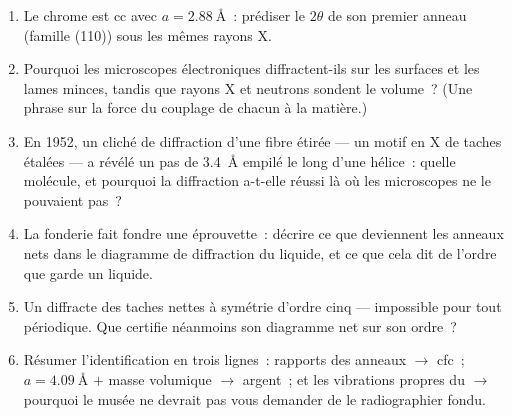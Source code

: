 \begin{problem}
\begin{enumerate}[resume]
  \item Le chrome est cc avec $a = \qty{2.88}{\angstrom}$~: prédiser
        le $2\theta$ de son premier anneau (famille (110)) sous les
        mêmes rayons X.
  \item Pourquoi les microscopes électroniques diffractent-ils sur
        les surfaces et les lames minces, tandis que rayons X et
        neutrons sondent le volume~? (Une phrase sur la force du
        couplage de chacun à la matière.)
  \item En 1952, un cliché de diffraction d'une fibre étirée --- un
        motif en X de taches étalées --- a révélé un pas de
        \qty{3.4}{\angstrom} empilé le long d'une hélice~: quelle
        molécule, et pourquoi la diffraction a-t-elle réussi là où
        les microscopes ne le pouvaient pas~?
  \item La fonderie fait fondre une éprouvette~: décrire ce que
        deviennent les anneaux nets dans le diagramme de diffraction
        du liquide, et ce que cela dit de l'ordre que garde un
        liquide.
  \item Un  diffracte des taches nettes à symétrie
        d'ordre cinq --- impossible pour tout  périodique. Que
        certifie néanmoins son diagramme net sur son ordre~?
  \item Résumer l'identification en trois lignes~: rapports des
        anneaux $\to$ cfc~; $a = \qty{4.09}{\angstrom}$ $+$ masse
        volumique $\to$ argent~; et les vibrations propres du 
        $\to$ pourquoi le musée ne devrait pas vous demander de le
        radiographier fondu.
\end{enumerate}
\end{problem}
